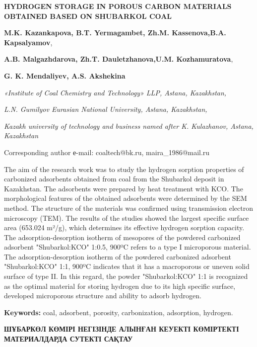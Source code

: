 
{\bfseries HYDROGEN STORAGE IN POROUS CARBON MATERIALS OBTAINED BASED ON
SHUBARKOL COAL}

{\bfseries {}M.K.
Kazankapova}{\bfseries \envelope ,
B.T.
Yermagambet}{\bfseries ,
Zh.M.
Kassenova}{\bfseries ,B.A.
Kapsalyamov},

{\bfseries {}A.B.
Malgazhdarova}{\bfseries ,
Zh.T.
Dauletzhanova}{\bfseries ,U.M.
Kozhamuratova},

{\bfseries {}G. K.
Mendaliyev}{\bfseries ,
A.S.
Akshekina}

\emph{«Institute of Coal Chemistry and Technology»
LLP, Astana, Kazakhstan,}

\emph{L.N. Gumilyov Eurasian National
University, Astana, Kazakhstan,}

\emph{Kazakh university of technology and business
named after K. Kulazhanov, Astana, Kazakhstan}

\envelope Corresponding author е-mail:
coaltech@bk.ru,
maira\_1986@mail.ru

The aim of the research work was to study the hydrogen sorption
properties of carbonized adsorbents obtained from coal from the
Shubarkol deposit in Kazakhstan. The adsorbents were prepared by heat
treatment with KCO. The morphological
features of the obtained adsorbents were determined by the SEM method.
The structure of the materials was confirmed using transmission electron
microscopy (TEM). The results of the studies showed the largest specific
surface area (653.024 m²/g), which determines its effective hydrogen
sorption capacity. The adsorption-desorption isotherm of mesopores of
the powdered carbonized adsorbent
"Shubarkol:KCO" 1:0.5, 900ºC refers to
a type I microporous material. The adsorption-desorption isotherm of the
powdered carbonized adsorbent
"Shubarkol:KCO" 1:1, 900ºC indicates
that it has a macroporous or uneven solid surface of type II. In this
regard, the powder "Shubarkol:KCO" 1:1
is recognized as the optimal material for storing hydrogen due to its
high specific surface, developed microporous structure and ability to
adsorb hydrogen.

{\bfseries Keywords:} coal, adsorbent, porosity, carbonization, adsorption,
hydrogen.

{\bfseries ШҰБАРКӨЛ КӨМІРІ НЕГІЗІНДЕ АЛЫНҒАН КЕУЕКТІ КӨМІРТЕКТІ
МАТЕРИАЛДАРДА СУТЕКТІ САҚТАУ}


